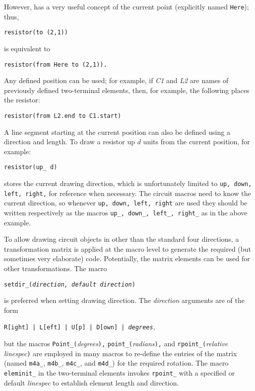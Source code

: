 \noindent
However, \pic has a very useful concept of the current point (explicitly
named {\tt Here}); thus,
\par
{\tt resistor(to (2,1))}
\par
\noindent
is equivalent to
\par
{\tt resistor(from Here to (2,1)).}

Any defined position can be used; for example, if {\sl C1} and {\sl L2}
are names of previously defined two-terminal elements,
then, for example, the following places the resistor: 
\par
{\tt resistor(from L2.end to C1.start)}

A line segment starting at the current position can also be defined using
a direction and length.
To draw a resistor up $d$ units from the current position, for example:
\par
{\tt resistor(up\_ d)}

\Pic stores the current drawing direction,
which is unfortunately limited to {\tt up, down, left, right,}
for reference when necessary.
The circuit macros need to know the current direction, so
whenever {\tt up, down, left, right} are used they should be written
respectively as the macros {\tt up\_, down\_, left\_, right\_} as in
the above example.

To allow drawing circuit objects in other than the standard four directions,
a transformation matrix
is applied at the macro level to generate the required
(but sometimes very elaborate) \pic code.
Potentially, the matrix elements can be used for other transformations.
The macro

{\tt setdir\_({\sl direction, default direction})}

\noindent
is preferred when setting drawing direction.  The {\sl direction} arguments
are of the form

{\tt R[ight] | L[eft] | U[p] | D[own] | {\sl degrees}},

\noindent
but the macros
{\tt Point\_(}{\sl degrees}{\tt ),}
{\tt point\_(}{\sl radians}{\tt ),}
and {\tt rpoint\_(}{\sl relative linespec}{\tt )} are employed in many macros
to re-define the entries
of the matrix
(named {\tt m4a\_}, {\tt m4b\_}, {\tt m4c\_}, and {\tt m4d\_})
for the required rotation.
The macro {\tt eleminit\_} in the two-terminal elements invokes
{\tt rpoint\_} with a specified or default {\sl linespec}
to establish element length and direction.

